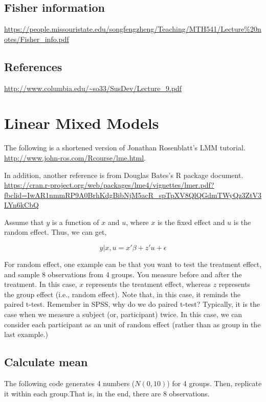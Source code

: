 \documentclass[]{book}
\begin{document}
\section{Fisher information}\label{fisher-information}

\url{https://people.missouristate.edu/songfengzheng/Teaching/MTH541/Lecture\%20notes/Fisher_info.pdf}

\section{References}\label{references}

\url{http://www.columbia.edu/~so33/SusDev/Lecture_9.pdf}

\chapter{Linear Mixed Models}\label{linear-mixed-models}

The following is a shortened version of Jonathan Rosenblatt's LMM
tutorial. \url{http://www.john-ros.com/Rcourse/lme.html}.

In addition, another reference is from Douglas Bates's R package
document.
\url{https://cran.r-project.org/web/packages/lme4/vignettes/lmer.pdf?fbclid=IwAR1nmmRP9A0BrhKdgBibNjM5acR_spTpXV8QlQGdmTWyQz3ZtV3LYn6kCbQ}

Assume that \(y\) is a function of \(x\) and \(u\), where \(x\) is the
fixed effect and \(u\) is the random effect. Thus, we can get,

\[y|x, u = x'\beta+z'u+\epsilon\]

For random effect, one example can be that you want to test the
treatment effect, and sample 8 observations from 4 groups. You measure
before and after the treatment. In this case, \(x\) represents the
treatment effect, whereas \(z\) represents the group effect (i.e.,
random effect). Note that, in this case, it reminds the paired t-test.
Remember in SPSS, why do we do paired t-test? Typically, it is the case
when we measure a subject (or, participant) twice. In this case, we can
consider each participant as an unit of random effect (rather than as
group in the last example.)

\section{Calculate mean}\label{calculate-mean}

The following code generates 4 numbers (\(N(0,10)\)) for 4 groups. Then,
replicate it within each group.That is, in the end, there are 8
observations.
\end{document}
